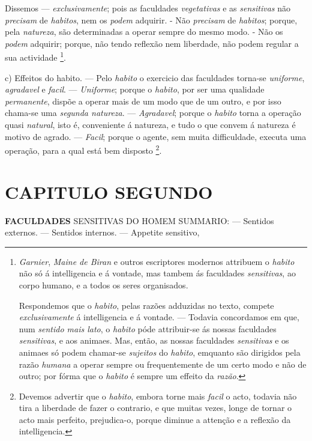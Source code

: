 Dissemos --- \emph{exclusivamente}; pois as faculdades \emph{vegetativas} e as \emph{sensitivas} não \emph{precisam} de \emph{habitos}, nem os \emph{podem} adquirir. - Não \emph{precisam} de \emph{habitos}; porque, pela \emph{natureza}, são determinadas a operar sempre do mesmo modo. - Não os \emph{podem} adquirir; porque, não tendo reflexão nem liberdade, não podem regular a sua actividade \footnote{\emph{Garnier}, \emph{Maine de Biran} e outros escriptores modernos attribuem o \emph{habito} não só á intelligencia e á vontade, mas tambem ás faculdades \emph{sensitivas}, ao corpo humano, e a todos os seres organisados.\par Respondemos que o \emph{habito}, pelas razões adduzidas no texto, compete \emph{exclusivamente} á intelligencia e á vontade. --- Todavia concordamos em que, num \emph{sentido mais lato}, o \emph{habito} póde attribuir-se ás nossas faculdades \emph{sensitivas}, e aos animaes. Mas, então, as nossas faculdades \emph{sensitivas} e os animaes só podem chamar-se \emph{sujeitos} do \emph{habito}, emquanto são dirigidos pela razão \emph{humana} a operar sempre ou frequentemente de um certo modo e não de outro; por fórma que o \emph{habito} é sempre um effeito da \emph{razão}.}.

c) Effeitos do habito. --- Pelo \emph{habito} o exercicio das faculdades torna-se \emph{uniforme}, \emph{agradavel} e \emph{facil}. --- \emph{Uniforme}; porque o \emph{habito}, por ser uma qualidade \emph{permanente}, dispõe a operar mais de um modo que de um outro, e por isso chama-se uma \emph{segunda natureza}. --- \emph{Agradavel}; porque o \emph{habito} torna a operação quasi \emph{natural}, isto é, conveniente á natureza, e tudo o que convem á natureza é motivo de agrado. --- \emph{Facil}; porque o agente, sem muita difficuldade, executa uma operação, para a qual está bem disposto \footnote{Devemos advertir que o \emph{habito}, embora torne mais \emph{facil} o acto, todavia não tira a liberdade de fazer o contrario, e que muitas vezes, longe de tornar o acto mais perfeito, prejudica-o, porque diminue a attenção e a reflexão da intelligencia.}.


\chapter*{CAPITULO SEGUNDO}

 \textbf{FACULDADES} SENSITIVAS DO HOMEM \textsc{SUMMARIO}: --- Sentidos externos. --- Sentidos internos. --- Appetite sensitivo,

